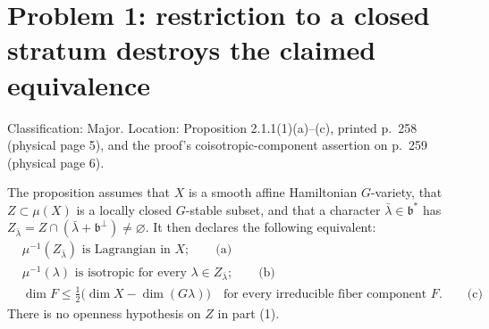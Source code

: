 \documentclass[10pt]{article}
\begin{document}
\section*{Problem 1: restriction to a closed stratum destroys the claimed equivalence}
Classification: Major. Location: Proposition 2.1.1(1)(a)–(c), printed p. 258 (physical page 5), and the proof’s coisotropic-component assertion on p. 259 (physical page 6).\par
The proposition assumes that \(X\) is a smooth affine Hamiltonian \(G\)-variety, that \(Z\subset\mu(X)\) is a locally closed \(G\)-stable subset, and that a character \(\bar\lambda\in\mathfrak b^*\) has \(Z_{\bar\lambda}=Z\cap(\bar\lambda+\mathfrak b^\perp)\ne\varnothing\). It then declares the following equivalent: \[\begin{aligned}
 &\mu^{-1}(Z_{\bar\lambda})\text{ is Lagrangian in }X; \qquad\text{(a)}\\
 &\mu^{-1}(\lambda)\text{ is isotropic for every }\lambda\in Z_{\bar\lambda}; \qquad\text{(b)}\\
 &\dim F\leq \tfrac12\bigl(\dim X-\dim(G\lambda)\bigr)
 \quad\text{for every irreducible fiber component }F. \qquad\text{(c)}\end{aligned}\] There is no openness hypothesis on \(Z\) in part (1).\par
\end{document}
